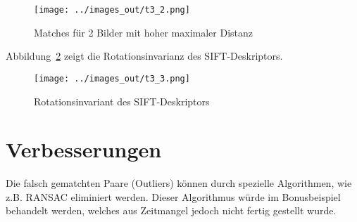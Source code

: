 \begin{figure}[htb]
 \centering
 \texttt{[image: ../images\_out/t3\_2.png]}
 \caption{Matches für 2 Bilder mit hoher maximaler Distanz}
 \label{fig:t3_2}
\end{figure}


Abbildung~\ref{fig:t3_3} zeigt die Rotationsinvarianz des SIFT-Deskriptors.


\begin{figure}[htb]
 \centering
 \texttt{[image: ../images\_out/t3\_3.png]}
 \caption{Rotationsinvariant des SIFT-Deskriptors}
 \label{fig:t3_3}
\end{figure}


\section{Verbesserungen}

Die falsch gematchten Paare (Outliers) können durch spezielle Algorithmen, wie z.B. RANSAC eliminiert werden. Dieser Algorithmus würde im Bonusbeispiel behandelt werden, welches aus Zeitmangel jedoch nicht fertig gestellt wurde.



%
%

\FloatBarrier\label{end-of-document}


